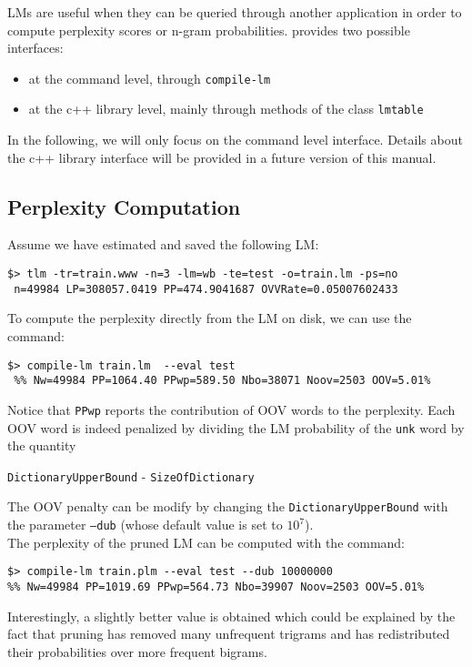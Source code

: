 LMs are useful when they can be queried through another application in order to compute 
perplexity scores or n-gram probabilities. {\IRSTLM} provides two possible interfaces: 
\begin{itemize}
\item at the command level, through  {\tt compile-lm}
\item at the c++ library level, mainly through methods of the class {\tt lmtable}
\end{itemize}

\noindent
In the following, we will only focus on the command level interface. Details about
the c++ library interface will be provided in a future version of this manual.  

\subsection{Perplexity Computation}
Assume we have estimated and saved the following LM:

\begin{verbatim}
$> tlm -tr=train.www -n=3 -lm=wb -te=test -o=train.lm -ps=no
 n=49984 LP=308057.0419 PP=474.9041687 OVVRate=0.05007602433
\end{verbatim}

\noindent
To compute the perplexity directly from the LM on disk, we can use the command:

\begin{verbatim}
$> compile-lm train.lm  --eval test
 %% Nw=49984 PP=1064.40 PPwp=589.50 Nbo=38071 Noov=2503 OOV=5.01%
\end{verbatim}
Notice that {\tt PPwp} reports the contribution of OOV words to the perplexity. Each OOV word is indeed penalized by dividing the
LM probability of the {\tt unk} word by  the quantity


\centerline{{\tt DictionaryUpperBound} - {\tt SizeOfDictionary}}

\noindent
The OOV penalty can be modify by changing the {\tt DictionaryUpperBound} with the parameter {\tt --dub} (whose default value is set to $10^7$). \\

\noindent
The perplexity of the pruned LM can be computed with the command:
\begin{verbatim}
$> compile-lm train.plm --eval test --dub 10000000
%% Nw=49984 PP=1019.69 PPwp=564.73 Nbo=39907 Noov=2503 OOV=5.01%
\end{verbatim}
Interestingly, a slightly better value is obtained which could be explained by the 
fact that pruning has removed many unfrequent trigrams and has redistributed 
their probabilities over more frequent bigrams.

